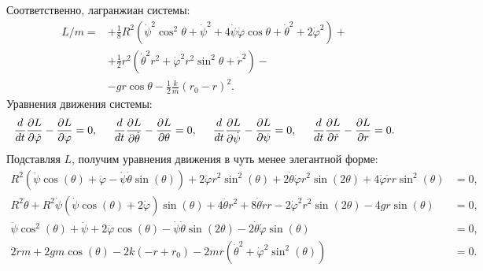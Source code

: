 Соответственно, лагранжиан системы:
\begin{equation}
    \begin{aligned}
        L/m =
            &+\frac{1}{8} R^{2} \left(\dot{\psi}^{2} \cos^{2} \theta + \dot{\psi}^{2} + 4 \dot{\psi} \dot{\varphi} \cos \theta + \dot{\theta}^{2} + 2 \dot{\varphi}^{2}\right) + \\
            &+ \frac{1}{2} r^2 \left(\dot{\theta}^{2} r^{2} + \dot{\varphi}^{2} r^{2} \sin^{2} \theta + \dot{r}^{2}\right)
            - \\
            &-  g r \cos \theta - \frac{1}{2} \frac{k}{m}  \left(r_{0} - r\right)^{2}.
    \end{aligned}
\end{equation}
Уравнения движения системы:
\begin{equation}
        \frac{d }{d t} \frac{\partial L}{\partial \dot{\varphi}} - \frac{\partial L}{\partial \varphi} = 0,\hspace{0.5cm} 
        \frac{d }{d t} \frac{\partial L}{\partial \dot{\theta}} - \frac{\partial L}{\partial \theta} = 0, \hspace{0.5cm} 
        \frac{d }{d t} \frac{\partial L}{\partial \dot{\psi}} - \frac{\partial L}{\partial \psi} = 0, \hspace{0.5cm} 
        \frac{d }{d t} \frac{\partial L}{\partial \dot{r}} - \frac{\partial L}{\partial r} = 0. 
\end{equation}
Подставляя $L$, получим уравнения движения в чуть менее элегантной форме:
\begin{equation}
    \begin{aligned}
        R^{2} \left(\ddot{\psi} \cos{\left(\theta \right)} + \ddot{\varphi} - \dot{\psi} \dot{\theta} \sin{\left(\theta \right)}\right) + 2 \ddot{\varphi} r^{2} \sin^{2}{\left(\theta \right)} + 2 \dot{\theta} \dot{\varphi} r^{2} \sin{\left(2 \theta \right)} + 4 \dot{\varphi} \dot{r} r \sin^{2}{\left(\theta \right)} &= 0, \\
        R^{2} \ddot{\theta} + R^{2} \dot{\psi} \left(\dot{\psi} \cos{\left(\theta \right)} + 2 \dot{\varphi}\right) \sin{\left(\theta \right)} + 4 \ddot{\theta} r^{2} + 8 \dot{\theta} \dot{r} r - 2 \dot{\varphi}^{2} r^{2} \sin{\left(2 \theta \right)} - 4 g r \sin{\left(\theta \right)} &= 0, \\
        \ddot{\psi} \cos^{2}{\left(\theta \right)} + \ddot{\psi} + 2 \ddot{\varphi} \cos{\left(\theta \right)} - \dot{\psi} \dot{\theta} \sin{\left(2 \theta \right)} - 2 \dot{\theta} \dot{\varphi} \sin{\left(\theta \right)} &= 0, \\
        2 \ddot{r} m + 2 g m \cos{\left(\theta \right)} - 2 k \left(- r + r_{0}\right) - 2 m r \left(\dot{\theta}^{2} + \dot{\varphi}^{2} \sin^{2}{\left(\theta \right)}\right) &= 0.
    \end{aligned}
\end{equation}